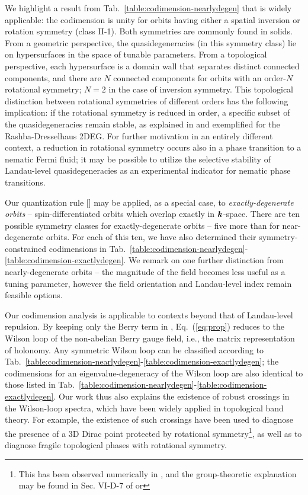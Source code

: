 We highlight a result from  Tab.\ \ref{table:codimension-nearlydegen} that is widely applicable: the codimension is unity for orbits having either a spatial inversion or rotation symmetry (class II-1). Both symmetries are commonly found in solids. From a geometric perspective, the quasidegeneracies (in this symmetry class) lie on hypersurfaces in the space of tunable parameters. From a topological perspective, each hypersurface is a domain wall that separates distinct connected components, and there are $N$ connected components for orbits with an order-$N$ rotational symmetry; $N=2$ in the case of inversion symmetry. This topological distinction between rotational symmetries of different orders has the following implication: if the rotational symmetry is reduced in order, a specific subset of the quasidegeneracies remain stable, as explained in  and exemplified for the Rashba-Dresselhaus 2DEG.  For further motivation in an entirely different context, a reduction in rotational symmetry   occurs also in a phase transition to a nematic Fermi fluid\cite{fradkin_nematic_2010}; it may be possible to utilize  the selective stability of Landau-level quasidegeneracies as an experimental indicator for nematic phase transitions. 

Our quantization rule [] may be applied, as a special case, to \textit{exactly-degenerate orbits} -- spin-differentiated orbits which overlap exactly in $\boldsymbol{k}$-space. There are ten possible symmetry classes for exactly-degenerate orbits -- five more than for near-degenerate orbits. For each of this ten, we have also determined their symmetry-constrained codimensions in Tab.\ \ref{table:codimension-nearlydegen}-\ref{table:codimension-exactlydegen}. We remark on one further distinction from nearly-degenerate orbits --  the magnitude of the field becomes less useful as a tuning parameter, however the field orientation and Landau-level index remain feasible options.


Our codimension analysis is applicable to contexts beyond that of Landau-level repulsion. By keeping only the Berry term in , Eq.\ ({\ref{eq:prop}}) reduces to the Wilson loop of the non-abelian Berry gauge field\cite{wilczek_appearance_1984}, i.e., the matrix representation of holonomy.  Any symmetric Wilson loop can be classified according to Tab.\ \ref{table:codimension-nearlydegen}-\ref{table:codimension-exactlydegen}; the codimensions for an eigenvalue-degeneracy of the Wilson loop are also identical to those listed in Tab.\ \ref{table:codimension-nearlydegen}-\ref{table:codimension-exactlydegen}. Our work thus also explains the existence of robust crossings in the Wilson-loop spectra, which have been widely applied in topological band theory. For example, the existence of such crossings have been used to diagnose the presence of a 3D Dirac point protected by rotational symmetry\footnote{This has been observed numerically in , and the group-theoretic explanation may be found in Sec. VI-D-7 of  or }, as well as to diagnose fragile topological phases with rotational symmetry\cite{bouhon_wilson_2018,bradlyn_disconnected_2018}.

